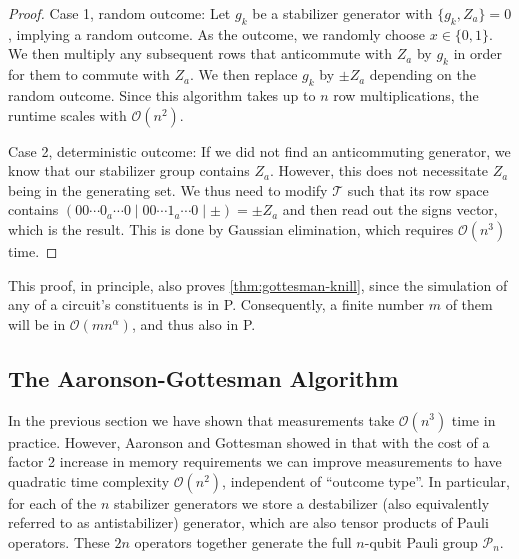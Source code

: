 \begin{proof}
  \par{Case 1, random outcome:}
  Let $g_k$ be a stabilizer generator with $\{g_k, Z_a\}=0$, implying a random
  outcome. As the outcome, we randomly choose $x\in\{0,1\}$. We then multiply
  any subsequent rows that anticommute with $Z_a$ by $g_k$ in order for them to
  commute with $Z_a$. We then replace $g_k$ by $\pm Z_a$ depending on the
  random outcome. Since this algorithm takes up to $n$ row multiplications,
  the runtime scales with $\mathcal{O}(n^2)$.

  \par{Case 2, deterministic outcome:}
  If we did not find an anticommuting generator, we know that our stabilizer
  group contains $Z_a$. However, this does not necessitate $Z_a$ being in the
  generating set.
  We thus need to modify
  $\mathcal{T}$ such that its row space contains $\left( 00\cdots 0_a\cdots 0\mid
  00\cdots 1_a \cdots 0 \mid \pm \right) = \pm Z_a$ and then read out the signs
  vector, which is the result. This is done by Gaussian
  elimination, which requires $\mathcal{O}(n^3)$ time.
\end{proof}
This proof, in principle, also proves \cref{thm:gottesman-knill}, since the
simulation of any of a circuit's constituents is in \textsf{P}. Consequently, a
finite number $m$ of them will be in $\mathcal{O}(mn^\alpha)$, and thus also in
\textsf{P}.

\subsection{The Aaronson-Gottesman Algorithm}\label{sec:tableau}
In the previous section we have shown that measurements take $\mathcal{O}(n^3)$
time in practice. However, Aaronson and Gottesman showed in
\cite{aaronsonImprovedSimulationStabilizer2004} that with the cost of a factor
2 increase in memory requirements we can improve measurements to have
quadratic time complexity $\mathcal{O}\left(n^2\right)$, independent of
\enquote{outcome type}. In particular, for each of the $n$ stabilizer
generators we store a destabilizer (also equivalently referred to as
antistabilizer) generator, which are also tensor products of Pauli operators.
These $2n$ operators together generate the full $n$-qubit Pauli group
$\mathcal{P}_n$.


